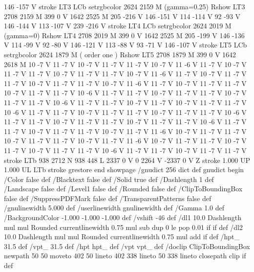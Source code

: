 146 -157 V
stroke
LT3
LCb setrgbcolor
2624 2159 M
(gamma=0.25) Rshow
LT3
2708 2159 M
399 0 V
1642 2525 M
205 -216 V
146 -151 V
114 -114 V
92 -93 V
146 -144 V
113 -107 V
239 -216 V
stroke
LT4
LCb setrgbcolor
2624 2019 M
(gamma=0) Rshow
LT4
2708 2019 M
399 0 V
1642 2525 M
205 -199 V
146 -136 V
114 -99 V
92 -80 V
146 -121 V
113 -88 V
93 -71 V
146 -107 V
stroke
LT5
LCb setrgbcolor
2624 1879 M
( order one ) Rshow
LT5
2708 1879 M
399 0 V
1642 2618 M
10 -7 V
11 -7 V
10 -7 V
11 -7 V
11 -7 V
10 -7 V
11 -6 V
11 -7 V
10 -7 V
11 -7 V
11 -7 V
10 -7 V
11 -7 V
11 -7 V
10 -7 V
11 -6 V
11 -7 V
10 -7 V
11 -7 V
11 -7 V
10 -7 V
11 -7 V
11 -7 V
10 -7 V
11 -6 V
11 -7 V
10 -7 V
11 -7 V
11 -7 V
10 -7 V
11 -7 V
11 -7 V
10 -6 V
11 -7 V
11 -7 V
10 -7 V
11 -7 V
11 -7 V
10 -7 V
11 -7 V
11 -7 V
10 -6 V
11 -7 V
11 -7 V
10 -7 V
11 -7 V
10 -7 V
11 -7 V
11 -7 V
10 -6 V
11 -7 V
11 -7 V
10 -7 V
11 -7 V
11 -7 V
10 -7 V
11 -7 V
11 -7 V
10 -6 V
11 -7 V
11 -7 V
10 -7 V
11 -7 V
11 -7 V
10 -7 V
11 -7 V
11 -7 V
10 -6 V
11 -7 V
11 -7 V
10 -7 V
11 -7 V
11 -7 V
10 -7 V
11 -7 V
11 -6 V
10 -7 V
11 -7 V
11 -7 V
10 -7 V
11 -7 V
11 -7 V
10 -7 V
11 -7 V
11 -6 V
10 -7 V
11 -7 V
11 -7 V
10 -7 V
11 -7 V
10 -7 V
11 -7 V
11 -7 V
10 -6 V
11 -7 V
11 -7 V
10 -7 V
11 -7 V
11 -7 V
stroke
LTb
938 2712 N
938 448 L
2337 0 V
0 2264 V
-2337 0 V
Z stroke
1.000 UP
1.000 UL
LTb
stroke
grestore
end
showpage
/gnudict 256 dict def
gnudict begin
%
%
/Color false def
/Blacktext false def
/Solid true def
/Dashlength 1 def
/Landscape false def
/Level1 false def
/Rounded false def
/ClipToBoundingBox false def
/SuppressPDFMark false def
/TransparentPatterns false def
/gnulinewidth 5.000 def
/userlinewidth gnulinewidth def
/Gamma 1.0 def
/BackgroundColor {-1.000 -1.000 -1.000} def
%
/vshift -46 def
/dl1 {
  10.0 Dashlength mul mul
  Rounded { currentlinewidth 0.75 mul sub dup 0 le { pop 0.01 } if } if
} def
/dl2 {
  10.0 Dashlength mul mul
  Rounded { currentlinewidth 0.75 mul add } if
} def
/hpt_ 31.5 def
/vpt_ 31.5 def
/hpt hpt_ def
/vpt vpt_ def
/doclip {
  ClipToBoundingBox {
    newpath 50 50 moveto 402 50 lineto 402 338 lineto 50 338 lineto closepath
    clip
  } if
} def

